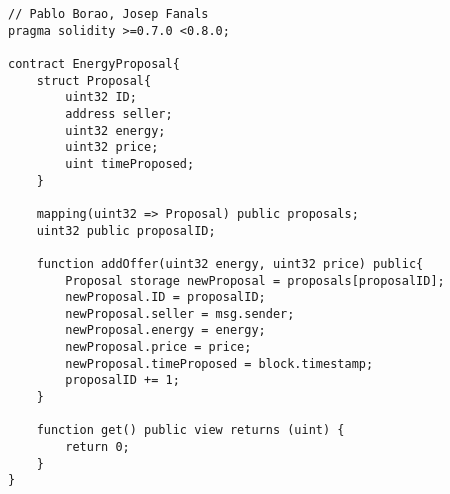 \begin{lstlisting}[caption={Smart contract code written in Solidity}]
    // Pablo Borao, Josep Fanals
pragma solidity >=0.7.0 <0.8.0;

contract EnergyProposal{
    struct Proposal{
        uint32 ID;
        address seller;
        uint32 energy;
        uint32 price;
        uint timeProposed;
    }
    
    mapping(uint32 => Proposal) public proposals;
    uint32 public proposalID;
    
    function addOffer(uint32 energy, uint32 price) public{
        Proposal storage newProposal = proposals[proposalID];
        newProposal.ID = proposalID;
        newProposal.seller = msg.sender;
        newProposal.energy = energy;
        newProposal.price = price;
        newProposal.timeProposed = block.timestamp;
        proposalID += 1;
    }
    
    function get() public view returns (uint) {
        return 0;
    }
} 
\end{lstlisting}

